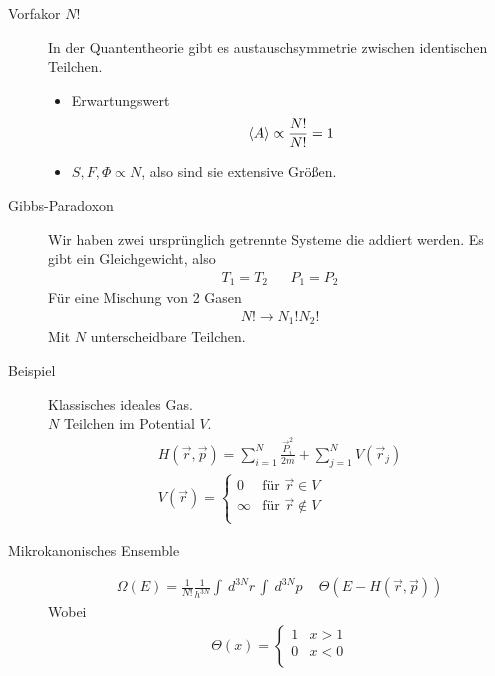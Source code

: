 \documentclass[11pt]{article}
\theoremstyle{plain}
\theoremstyle{mytheoremstyle}
\renewcommand{\d}[1]{\,d#1\,}
\begin{document}
\begin{description}
  \item[Vorfakor $N!$] 
    In der Quantentheorie gibt es austauschsymmetrie zwischen identischen
    Teilchen.
    \begin{itemize}
      \item Erwartungswert
        \begin{align*}
          \Braket{A} \propto \frac{N!}{N!} = 1
        \end{align*}
      \item $S, F, \Phi \propto N$, also sind sie extensive Gr\"o\ss{}en.
    \end{itemize}
  \item[Gibbs-Paradoxon]
    Wir haben zwei urspr\"unglich getrennte Systeme die addiert werden.
    Es gibt ein Gleichgewicht, also 
    \begin{align*}
      T_1 = T_2 && P_1 = P_2
    \end{align*}
    F\"ur eine Mischung von 2 Gasen 
    \begin{align*}
      N! \to N_1! N_2!
    \end{align*}
    Mit $N$ unterscheidbare Teilchen.
  \item [Beispiel] Klassisches ideales Gas. \\
    $N$ Teilchen im Potential $V$.
    \begin{align*}
      H(\vec{r}, \vec{p}) = \sum_{i=1}^{ N} \frac{\vec{P}_i ^2}{ 2m}
      + \sum_{j = 1}^{ N} V(\vec{r}_j) \\
      V(\vec{r}) = 
      \begin{cases}
        0 & \text{f\"ur } \vec{r} \in V \\
        \infty & \text{f\"ur } \vec{r} \not\in V \\
      \end{cases}
    \end{align*}
%
    \item[Mikrokanonisches Ensemble]
      \begin{align*}
        \Omega(E) = \frac{1}{N!} \frac{1}{h^{3N}} \int_{}^{} \d{^{3N} r}
        \int_{}^{} \d{^{3N} p} \quad \Theta(E - H(\vec{r}, \vec{p}))
      \end{align*}
      Wobei
      \begin{align*}
        \Theta(x) = \begin{cases}
          1 & x>1 \\
          0 & x <0 \\

\end{cases}
\end{align*}
\end{description}
\end{document}
